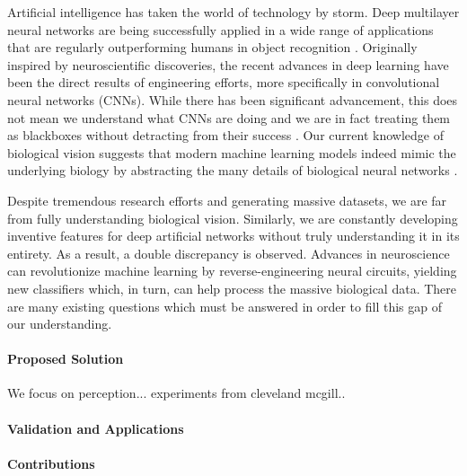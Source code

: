 
\maketitle

Artificial intelligence has taken the world of technology by storm. Deep multilayer neural networks are being successfully applied in a wide range of applications that are regularly outperforming humans in object recognition \cite{krizhevsky_imagenet2012, simonyan_very_deep2014,szegedy2015}. 
Originally inspired by neuroscientific discoveries, the recent advances in deep learning have been the direct results of engineering efforts, more specifically in convolutional neural networks (CNNs). 
While there has been significant advancement, this does not mean we understand what CNNs are doing and we are in fact treating them as blackboxes without detracting from their success \cite{goodfellow_book, deeplearning_blackbox2017}. 
Our current knowledge of biological vision suggests that modern machine learning models indeed mimic the underlying biology by abstracting the many details of biological neural networks \cite{yamins2016using, hassabis2017neuroscience}.




Despite tremendous research efforts and generating massive datasets, we are far from fully understanding biological vision. 
Similarly, we are constantly developing inventive features for deep artificial networks without truly understanding it in its entirety. As a result, a double discrepancy is observed. 
Advances in neuroscience can revolutionize machine learning by reverse-engineering neural circuits, yielding new classifiers which, in turn, can help process the massive biological data. 
There are many existing questions which must be answered in order to fill this gap of our understanding.

\paragraph{Proposed Solution}


We focus on perception... experiments from cleveland mcgill..

\paragraph{Validation and Applications}

\paragraph{Contributions}



